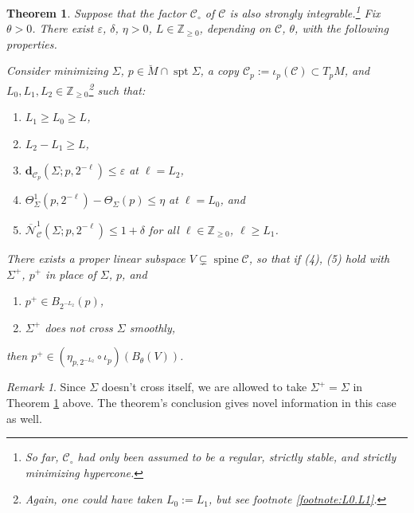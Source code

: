 \documentclass[11pt, letterpaper, reqno]{amsart}
\numberwithin{equation}{section}
\newtheorem{Thm}[Def]{Theorem}
\theoremstyle{remark}
\newtheorem{Rem}[Def]{Remark}
\newcommand{\ZZ}{\mathbb{Z}}
\newcommand{\cC}{\mathcal{C}}
\newcommand{\cN}{\mathcal{N}}
\newcommand{\mbfd}{\mathbf{d}}
\newcommand{\spt}{\operatorname{spt}}
\newcommand{\spine}{\operatorname{spine}}
\newcommand{\eps}{\varepsilon}
\begin{document}
\begin{Thm} \label{theo:freq-1-subspace}
        Suppose that the factor $\cC_\circ$ of $\cC$ is also strongly integrable.\footnote{So far, $\cC_\circ$ had only been assumed to be a regular, strictly stable, and strictly minimizing hypercone.} Fix $\theta>0$. There exist $\eps$, $\delta$, $\eta>0$, $L \in \ZZ_{\geq 0}$, depending on $\cC$, $\theta$, with the following properties. 

Consider minimizing $\Sigma$, $p \in \breve M \cap \spt \Sigma$, a copy $\cC_p := \iota_p(\cC) \subset T_p M$, and $L_0, L_1, L_2 \in \ZZ_{\geq 0}$\footnote{Again, one could have taken $L_0 := L_1$, but see footnote \ref{footnote:L0.L1}.} such that:
\begin{enumerate}
\item $L_1 \geq L_0 \geq L$,
\item $L_2 - L_1 \geq L$,
\item $\mbfd_{\cC_p}(\Sigma; p, 2^{-\ell}) \leq \eps$ at $\ell = L_2$, 
\item $\Theta^{1}_\Sigma(p,2^{-\ell}) - \Theta_\Sigma(p) \leq \eta$ at $\ell = L_0$, and
\item $\overline{\cN}^{1}_{\cC}(\Sigma;p,2^{-\ell}) \leq 1+\delta$ for all $\ell \in \ZZ_{\geq 0}$, $\ell \geq L_1$.
\end{enumerate}
There exists a proper linear subspace $V\subsetneq \spine \cC$, so that if (4), (5) hold with $\Sigma^+$, $p^+$ in place of $\Sigma$, $p$, and
\begin{enumerate}
\item[(6)] $p^+ \in B_{2^{-L_2}}(p)$, 
\item[(7)] $\Sigma^+$ does not cross $\Sigma$ smoothly,
\end{enumerate}
then $p^+ \in (\eta_{p,2^{-L_2}} \circ \iota_p)(B_\theta(V))$. 
\end{Thm}

\begin{Rem} \label{rema:freq-1-subspace}
    Since $\Sigma$ doesn't cross itself, we are allowed to take $\Sigma^+ = \Sigma$ in Theorem \ref{theo:freq-1-subspace} above. The theorem's conclusion gives novel information in this case as well. 
\end{Rem}
\end{document}
